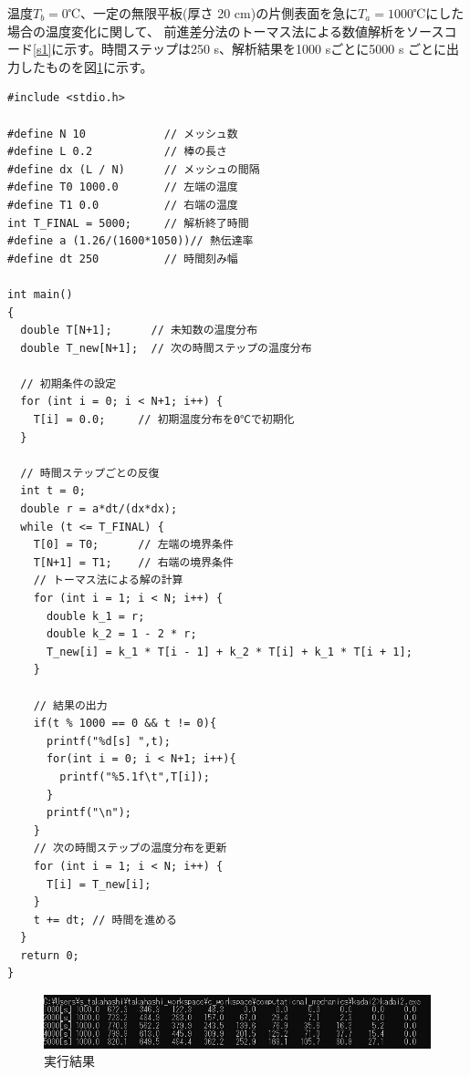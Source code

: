 温度$T_b=0$℃、一定の無限平板(厚さ 20 \si{\cm})の片側表面を急に$T_a = 1000$℃にした場合の温度変化に関して、
前進差分法のトーマス法による数値解析をソースコード\ref{s1}に示す。時間ステップは250 \si{s}、解析結果を1000 \si{s}ごとに5000 \si{s}
ごとに出力したものを図\ref{im1}に示す。
\begin{lstlisting}[caption=前進差分法のトーマス法による数値解析プログラム,label=s1]
#include <stdio.h>

#define N 10            // メッシュ数
#define L 0.2           // 棒の長さ
#define dx (L / N)      // メッシュの間隔
#define T0 1000.0       // 左端の温度
#define T1 0.0          // 右端の温度
int T_FINAL = 5000;     // 解析終了時間
#define a (1.26/(1600*1050))// 熱伝達率
#define dt 250          // 時間刻み幅
  
int main()
{
  double T[N+1];      // 未知数の温度分布
  double T_new[N+1];  // 次の時間ステップの温度分布

  // 初期条件の設定
  for (int i = 0; i < N+1; i++) {
    T[i] = 0.0;     // 初期温度分布を0℃で初期化
  }

  // 時間ステップごとの反復
  int t = 0;
  double r = a*dt/(dx*dx);
  while (t <= T_FINAL) {
    T[0] = T0;      // 左端の境界条件
    T[N+1] = T1;    // 右端の境界条件
    // トーマス法による解の計算
    for (int i = 1; i < N; i++) {
      double k_1 = r;
      double k_2 = 1 - 2 * r;
      T_new[i] = k_1 * T[i - 1] + k_2 * T[i] + k_1 * T[i + 1];
    }
  
    // 結果の出力
    if(t % 1000 == 0 && t != 0){
      printf("%d[s] ",t);
      for(int i = 0; i < N+1; i++){
        printf("%5.1f\t",T[i]);
      }
      printf("\n");
    }
    // 次の時間ステップの温度分布を更新
    for (int i = 1; i < N; i++) {
      T[i] = T_new[i];
    }
    t += dt; // 時間を進める
  }
  return 0;
}
\end{lstlisting}

\begin{figure}[H]
  \includegraphics[width=\columnwidth]{img/k2.png}
  \caption{実行結果}
  \label{im1}
\end{figure}